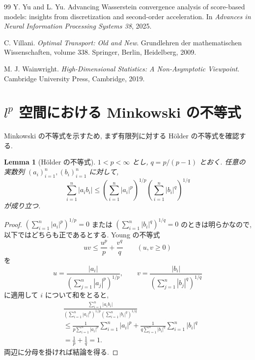 \documentclass[11pt]{article}
\theoremstyle{breakstyle}
\newtheorem{lemma}[theorem]{Lemma}
\begin{document}
\begin{thebibliography}{99}
Y. Yu and L. Yu.
\newblock Advancing Wasserstein convergence analysis of score-based models: insights from discretization and second-order acceleration.
\newblock In \emph{Advances in Neural Information Processing Systems 38}, 2025.

C. Villani.
\newblock \emph{Optimal Transport: Old and New}.
\newblock Grundlehren der mathematischen Wissenschaften, volume 338.
Springer, Berlin, Heidelberg, 2009.

M. J. Wainwright.
\newblock \emph{High-Dimensional Statistics: A Non-Asymptotic
Viewpoint}.
\newblock Cambridge University Press, Cambridge, 2019.

\end{thebibliography}

\clearpage
\appendix
\section{$l^p$ 空間における Minkowski の不等式}
\label{app:lp-inequalities}

Minkowski の不等式を示すため, まず有限列に対する H\"older の不等式を確認する.

\begin{lemma}[H\"older の不等式]
    \label{lem:holder-finite}
    $1<p<\infty$ とし, $q=p/(p-1)$ とおく. 任意の実数列
    $(a_i)_{i=1}^n,(b_i)_{i=1}^n$ に対して,
    \begin{equation*}
        \sum_{i=1}^n |a_i b_i|
        \leq
        \left(\sum_{i=1}^n|a_i|^p\right)^{1/p}
        \left(\sum_{i=1}^n|b_i|^q\right)^{1/q}
    \end{equation*}
    が成り立つ.
\end{lemma}
\begin{proof}
    $\left(\sum_{i=1}^n|a_i|^p\right)^{1/p}=0$ または
    $\left(\sum_{i=1}^n|b_i|^q\right)^{1/q}=0$ のときは明らかなので,
    以下ではどちらも正であるとする. Young の不等式
    \begin{equation*}
        uv\leq \frac{u^p}{p}+\frac{v^q}{q}
        \qquad (u,v\geq0)
    \end{equation*}
    を
    \begin{equation*}
        u=\frac{|a_i|}{\left(\sum_{j=1}^n|a_j|^p\right)^{1/p}},
        \qquad
        v=\frac{|b_i|}{\left(\sum_{j=1}^n|b_j|^q\right)^{1/q}}
    \end{equation*}
    に適用して $i$ について和をとると,
    \begin{align*}
        &\frac{\displaystyle\sum_{i=1}^n|a_i b_i|}
        {\displaystyle
        \left(\sum_{i=1}^n|a_i|^p\right)^{1/p}
        \left(\sum_{i=1}^n|b_i|^q\right)^{1/q}}\\
        &\leq
        \frac{1}{p\sum_{i=1}^n|a_i|^p}\sum_{i=1}^n|a_i|^p
        +\frac{1}{q\sum_{i=1}^n|b_i|^q}\sum_{i=1}^n|b_i|^q\\
        &=\frac1p+\frac1q=1.
    \end{align*}
    両辺に分母を掛ければ結論を得る.
\end{proof}
\end{document}
